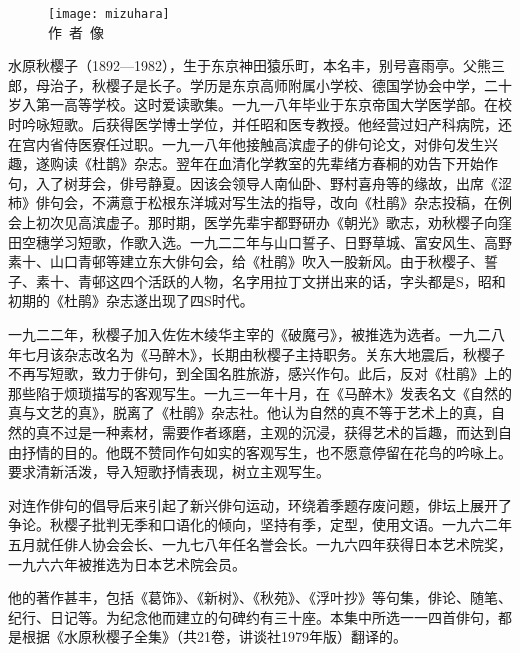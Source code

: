 \begin{center}
    \begin{figure}
        \centering
        \texttt{[image: mizuhara]}\\[1em]
        \large{\FS 作~者~像}
    \end{figure}
\end{center}

\newpage

{\FS
    水原秋樱子（1892—1982），生于东京神田猿乐町，本名丰，别号喜雨亭。父熊三郎，母治子，秋樱子是长子。学历是东京高师附属小学校、德国学协会中学，二十岁入第一高等学校。这时爱读歌集。一九一八年毕业于东京帝国大学医学部。在校时吟咏短歌。后获得医学博士学位，并任昭和医专教授。他经营过妇产科病院，还在宫内省侍医寮任过职。一九一八年他接触高滨虚子的俳句论文，对俳句发生兴趣，遂购读《杜鹊》杂志。翌年在血清化学教室的先辈绪方春桐的劝告下开始作句，入了树芽会，俳号静夏。因该会领导人南仙卧、野村喜舟等的缘故，出席《涩柿》俳句会，不满意于松根东洋城对写生法的指导，改向《杜鹃》杂志投稿，在例会上初次见高滨虚子。那时期，医学先辈宇都野研办《朝光》歌志，劝秋樱子向窪田空穗学习短歌，作歌入选。一九二二年与山口誓子、日野草城、富安风生、高野素十、山口青邨等建立东大俳句会，给《杜鹃》吹入一股新风。由于秋樱子、誓子、素十、青邨这四个活跃的人物，名字用拉丁文拼出来的话，字头都是S，昭和初期的《杜鹃》杂志遂出现了四S时代。

    一九二二年，秋樱子加入佐佐木绫华主宰的《破魔弓》，被推选为选者。一九二八年七月该杂志改名为《马醉木》，长期由秋樱子主持职务。关东大地震后，秋樱子不再写短歌，致力于俳句，到全国名胜旅游，感兴作句。此后，反对《杜鹃》上的那些陷于烦琐描写的客观写生。一九三一年十月，在《马醉木》发表名文《自然的真与文艺的真》，脱离了《杜鹃》杂志社。他认为自然的真不等于艺术上的真，自然的真不过是一种素材，需要作者琢磨，主观的沉浸，获得艺术的旨趣，而达到自由抒情的目的。他既不赞同作句如实的客观写生，也不愿意停留在花鸟的吟咏上。要求清新活泼，导入短歌抒情表现，树立主观写生。

    对连作俳句的倡导后来引起了新兴俳句运动，环绕着季题存废问题，俳坛上展开了争论。秋樱子批判无季和口语化的倾向，坚持有季，定型，使用文语。一九六二年五月就任俳人协会会长、一九七八年任名誉会长。一九六四年获得日本艺术院奖，一九六六年被推选为日本艺术院会员。

    他的著作甚丰，包括《葛饰》、《新树》、《秋苑》、《浮叶抄》等句集，俳论、随笔、纪行、日记等。为纪念他而建立的句碑约有三十座。本集中所选一一四首俳句，都是根据《水原秋樱子全集》（共21卷，讲谈社1979年版）翻译的。
}

\newpage

